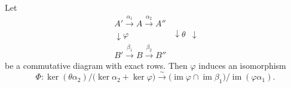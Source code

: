 Let
$$\begin{array}{ccc}
A' \xrightarrow{\alpha_1} A \xrightarrow{\alpha_2} A'' \\
\downarrow\scriptstyle{\varphi} & \downarrow\scriptstyle{\theta} & \downarrow \\
B' \xrightarrow{\beta_1} B \xrightarrow{\beta_2} B''
\end{array}$$
be a commutative diagram with exact rows. Then $\varphi$ induces an isomorphism
$$\Phi : \ker(\theta \alpha_2) \big/ \bigl(\ker \alpha_2 + \ker \varphi\bigr) \xrightarrow{\sim} \bigl(\operatorname{im} \varphi \cap \operatorname{im} \beta_1\bigr) \big/ \operatorname{im}(\varphi \alpha_1).$$
